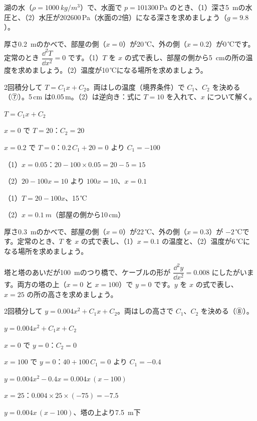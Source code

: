 \begin{jibun}
\raggedright 湖の水（$\rho=\qty{1000}{kg/m^3}$）で、水面で $p=\num{101300}$\,Pa のとき、（1）深さ\qty{5}{m}の水圧と、（2）水圧が\num{202600}\,Pa（水面の2倍）になる深さを求めましょう（$g=9.8$）。
\end{jibun}

\begin{reidai}
厚さ\qty{0.2}{m}のかべで、部屋の側（$x=0$）が20\,℃、外の側（$x=0.2$）が0\,℃です。定常のとき $\dfrac{\dd^2T}{\dd x^2}=0$ です。（1）$T$ を $x$ の式で表し、部屋の側から\qty{5}{cm}の所の温度を求めましょう。（2）温度が10\,℃になる場所を求めましょう。\par
\kangaekata 2回積分して $T=C_1x+C_2$。両はしの温度（境界条件）で $C_1$、$C_2$ を決める（⑦）。5\,cm は0.05\,m。（2）は逆向き：式に $T=10$ を入れて、$x$ について解く。\par
\shiki $T=C_1x+C_2$\par
\bkvidl $x=0$ で $T=20$：$C_2=20$\par
\bkvidl $x=0.2$ で $T=0$：$0.2\,C_1+20=0$ より $C_1=-100$\par
\bkvidl （1）$x=0.05$：$20-100\times0.05=20-5=15$\par
\bkvidl （2）$20-100x=10$ より $100x=10$、$x=0.1$\par
\kotae （1）$T=20-100x$、15\,℃\par
\bkvidl（2）$x=\qty{0.1}{m}$（部屋の側から10\,cm）
\end{reidai}


\begin{jibun}
\raggedright 厚さ\qty{0.3}{m}のかべで、部屋の側（$x=0$）が22\,℃、外の側（$x=0.3$）が $-2$\,℃です。定常のとき、$T$ を $x$ の式で表し、（1）$x=0.1$ の温度と、（2）温度が6\,℃になる場所を求めましょう。
\end{jibun}

\begin{reidai}
塔と塔のあいだが\qty{100}{m}のつり橋で、ケーブルの形が $\dfrac{\dd^2y}{\dd x^2}=0.008$ にしたがいます。両方の塔の上（$x=0$ と $x=100$）で $y=0$ です。$y$ を $x$ の式で表し、$x=25$ の所の高さを求めましょう。\par
\kangaekata 2回積分して $y=0.004x^2+C_1x+C_2$。両はしの高さで $C_1$、$C_2$ を決める（⑧）。\par
\shiki $y=0.004x^2+C_1x+C_2$\par
\bkvidl $x=0$ で $y=0$：$C_2=0$\par
\bkvidl $x=100$ で $y=0$：$40+100\,C_1=0$ より $C_1=-0.4$\par
\bkvidl $y=0.004x^2-0.4x=0.004x\,(x-100)$\par
\bkvidl $x=25$：$0.004\times25\times(-75)=-7.5$\par
\kotae $y=0.004x\,(x-100)$、塔の上より\qty{7.5}{m}下
\end{reidai}

